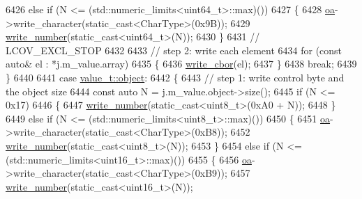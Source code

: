 \begin{DoxyCode}
6426                 \textcolor{keywordflow}{else} \textcolor{keywordflow}{if} (N <= (std::numeric\_limits<uint64\_t>::max)())
6427                 \{
6428                     \hyperlink{classnlohmann_1_1detail_1_1binary__writer_a6f15b782a7900f50ef37d123008e601b}{oa}->write\_character(static\_cast<CharType>(0x9B));
6429                     \hyperlink{classnlohmann_1_1detail_1_1binary__writer_a62cfd50a511371e718f37ad7bb29ae9d}{write\_number}(static\_cast<uint64\_t>(N));
6430                 \}
6431                 \textcolor{comment}{// LCOV\_EXCL\_STOP}
6432 
6433                 \textcolor{comment}{// step 2: write each element}
6434                 \textcolor{keywordflow}{for} (\textcolor{keyword}{const} \textcolor{keyword}{auto}& el : *j.m\_value.array)
6435                 \{
6436                     \hyperlink{classnlohmann_1_1detail_1_1binary__writer_aa0ab8d27fd88a33a2f801413ac4c7fbc}{write\_cbor}(el);
6437                 \}
6438                 \textcolor{keywordflow}{break};
6439             \}
6440 
6441             \textcolor{keywordflow}{case} \hyperlink{namespacenlohmann_1_1detail_a1ed8fc6239da25abcaf681d30ace4985aa8cfde6331bd59eb2ac96f8911c4b666}{value\_t::object}:
6442             \{
6443                 \textcolor{comment}{// step 1: write control byte and the object size}
6444                 \textcolor{keyword}{const} \textcolor{keyword}{auto} N = j.m\_value.object->size();
6445                 \textcolor{keywordflow}{if} (N <= 0x17)
6446                 \{
6447                     \hyperlink{classnlohmann_1_1detail_1_1binary__writer_a62cfd50a511371e718f37ad7bb29ae9d}{write\_number}(static\_cast<uint8\_t>(0xA0 + N));
6448                 \}
6449                 \textcolor{keywordflow}{else} \textcolor{keywordflow}{if} (N <= (std::numeric\_limits<uint8\_t>::max)())
6450                 \{
6451                     \hyperlink{classnlohmann_1_1detail_1_1binary__writer_a6f15b782a7900f50ef37d123008e601b}{oa}->write\_character(static\_cast<CharType>(0xB8));
6452                     \hyperlink{classnlohmann_1_1detail_1_1binary__writer_a62cfd50a511371e718f37ad7bb29ae9d}{write\_number}(static\_cast<uint8\_t>(N));
6453                 \}
6454                 \textcolor{keywordflow}{else} \textcolor{keywordflow}{if} (N <= (std::numeric\_limits<uint16\_t>::max)())
6455                 \{
6456                     \hyperlink{classnlohmann_1_1detail_1_1binary__writer_a6f15b782a7900f50ef37d123008e601b}{oa}->write\_character(static\_cast<CharType>(0xB9));
6457                     \hyperlink{classnlohmann_1_1detail_1_1binary__writer_a62cfd50a511371e718f37ad7bb29ae9d}{write\_number}(static\_cast<uint16\_t>(N));

\end{DoxyCode}
